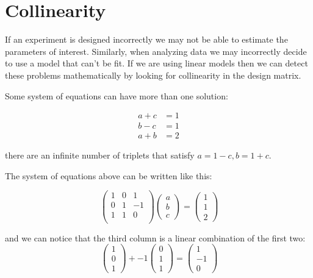 \documentclass[
  letterpaper,
  DIV=11,
  numbers=noendperiod]{scrartcl}
\begin{document}
\section{Collinearity}\label{collinearity}

If an experiment is designed incorrectly we may not be able to estimate
the parameters of interest. Similarly, when analyzing data we may
incorrectly decide to use a model that can't be fit. If we are using
linear models then we can detect these problems mathematically by
looking for collinearity in the design matrix.

Some system of equations can have more than one solution:

\begin{align*}
a+c &=1\\
b-c &=1\\
a+b &=2
\end{align*}

there are an infinite number of triplets that satisfy \(a=1-c, b=1+c\).

The system of equations above can be written like this:

\[
\,
\begin{pmatrix}
1&0&1\\
0&1&-1\\
1&1&0\\
\end{pmatrix}
\begin{pmatrix}
a\\
b\\
c
\end{pmatrix}
=
\begin{pmatrix}
1\\
1\\
2
\end{pmatrix}
\]

and we can notice that the third column is a linear combination of the
first two: \[
\,
\begin{pmatrix}
1\\
0\\
1
\end{pmatrix}
+
-1 \begin{pmatrix}
0\\
1\\
1
\end{pmatrix}
=
\begin{pmatrix}
1\\
-1\\
0
\end{pmatrix}
\]
\end{document}
